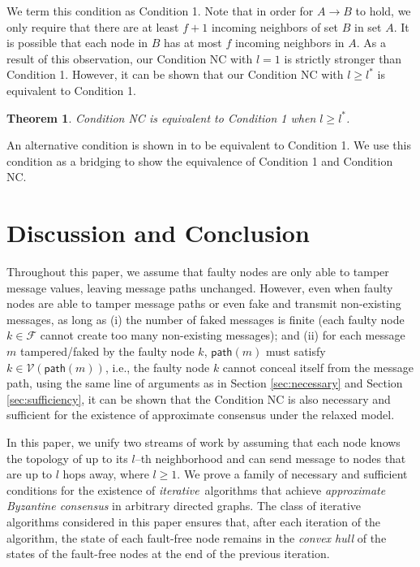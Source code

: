 \documentclass[letterpaper, 11pt]{article}
\newtheorem{theorem}{Theorem}[section]
\newcommand{\calF}{{\mathcal{F}}}
\newcommand{\calV}{{\mathcal{V}}}
\begin{document}
We term this condition as Condition 1. Note that in order for $A\to B$ to hold, we only require that there are at least $f+1$ incoming neighbors of set $B$ in set $A$. It is possible that each node in $B$ has at most $f$ incoming neighbors in $A$. As a result of this observation, our Condition NC with $l=1$ is strictly stronger than Condition 1. However, it can be shown that our Condition NC with $l\ge l^*$ is equivalent to Condition 1. 

\begin{theorem}
\label{equivaDirected}
Condition NC is equivalent to Condition 1 when $l\ge l^*$.
\end{theorem}

An alternative condition is shown in \cite{Tseng2014} to be equivalent to Condition 1. We use this condition as a bridging to show the equivalence of Condition 1 and Condition NC.

\section{Discussion and Conclusion}
\label{sec:conclusion}

Throughout this paper, we assume that faulty nodes are only able to tamper message values, leaving
message paths unchanged. However, even when faulty nodes are able to tamper message paths or even fake and transmit non-existing messages,
as long as (i) the number of faked messages is finite (each faulty node $k\in \calF$ cannot create too many non-existing messages);
and (ii) for each message $m$ tampered/faked by the faulty node $k$,  $\mathsf{path}(m)$ must satisfy $k\in \calV(\mathsf{path}(m))$, i.e., the faulty node $k$ cannot conceal itself from the message path,
using the same line of arguments as in Section \ref{sec:necessary} and Section \ref{sec:sufficiency}, it can be shown that the Condition NC is also necessary and sufficient for the existence of approximate consensus under the relaxed model.

In this paper, we unify two streams of work by assuming that each node knows the topology of up to its $l$--th neighborhood and can send message to nodes that are up to $l$ hops away, where $l\ge 1$. We prove a family of necessary and sufficient conditions for the existence
of {\em iterative}\, algorithms that achieve {\em approximate Byzantine consensus}
in arbitrary directed graphs.
The class of iterative algorithms considered in this paper ensures
that, after each iteration of the algorithm, the state of each fault-free node remains
in the {\em convex hull} of the states of the fault-free nodes at the end of
the previous iteration. 
\end{document}
